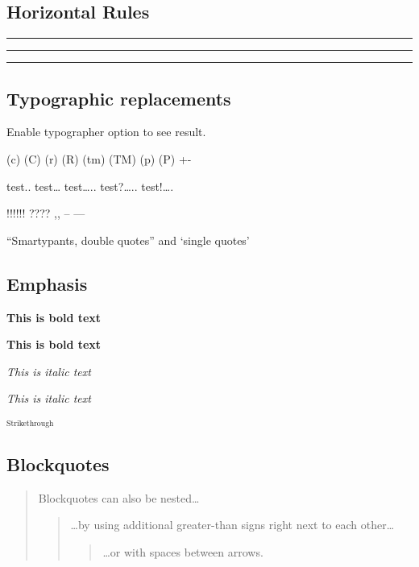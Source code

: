 \documentclass[]{article}
\begin{document}
\subsection{Horizontal Rules}\label{horizontal-rules}

\begin{center}\rule{0.5\linewidth}{\linethickness}\end{center}

\begin{center}\rule{0.5\linewidth}{\linethickness}\end{center}

\begin{center}\rule{0.5\linewidth}{\linethickness}\end{center}

\subsection{Typographic replacements}\label{typographic-replacements}

Enable typographer option to see result.

(c) (C) (r) (R) (tm) (TM) (p) (P) +-

test.. test\ldots{} test\ldots{}.. test?\ldots{}.. test!\ldots{}.

!!!!!! ???? ,, -- ---

``Smartypants, double quotes'' and `single quotes'

\subsection{Emphasis}\label{emphasis}

\textbf{This is bold text}

\textbf{This is bold text}

\emph{This is italic text}

\emph{This is italic text}

\textsubscript{\textsubscript{Strikethrough}}

\subsection{Blockquotes}\label{blockquotes}

\begin{quote}
Blockquotes can also be nested\ldots{}

\begin{quote}
\ldots{}by using additional greater-than signs right next to each
other\ldots{}

\begin{quote}
\ldots{}or with spaces between arrows.
\end{quote}
\end{quote}
\end{quote}
\end{document}
